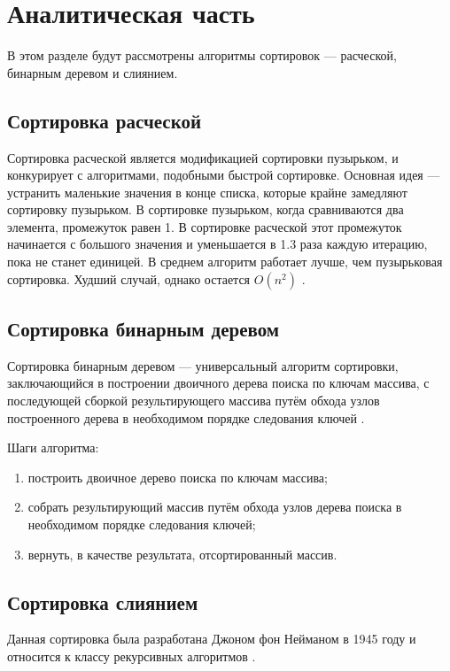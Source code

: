 \chapter{Аналитическая часть}
В этом разделе будут рассмотрены алгоритмы сортировок --- расческой, бинарным деревом и слиянием.

\section{Сортировка расческой}
Сортировка расческой является модификацией сортировки пузырьком, и конкурирует с алгоритмами, подобными быстрой сортировке. 
Основная идея --- устранить маленькие значения в конце списка, которые крайне замедляют сортировку пузырьком. 
В сортировке пузырьком, когда сравниваются два элемента, промежуток равен 1. 
В сортировке расческой этот промежуток начинается с большого значения и уменьшается в 1.3 раза каждую итерацию, пока не станет единицей. 
В среднем алгоритм работает лучше, чем пузырьковая сортировка. 
Худший случай, однако остается $O(n^2)$ \cite{comb}.

\section{Сортировка бинарным деревом}

Сортировка бинарным деревом --- универсальный алгоритм сортировки, заключающийся в построении двоичного дерева поиска по ключам массива, с последующей сборкой результирующего массива путём обхода узлов построенного дерева в необходимом порядке следования ключей \cite{Knut}.

Шаги алгоритма:
\begin{enumerate}[label=\arabic*)]
	\item построить двоичное дерево поиска по ключам массива;
	\item собрать результирующий массив путём обхода узлов дерева поиска в необходимом порядке следования ключей;
	\item вернуть, в качестве результата, отсортированный массив.
\end{enumerate}

\section{Сортировка слиянием}
Данная сортировка была разработана Джоном фон Нейманом в 1945 году и относится к классу рекурсивных алгоритмов \cite{algos}. 

